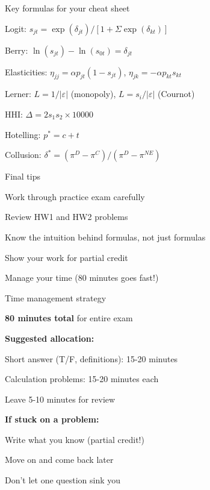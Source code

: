 \documentclass[notes,11pt, aspectratio=169]{beamer}
\newenvironment{wideitemize}{\itemize\addtolength{\itemsep}{10pt}}{\enditemize}
\newenvironment{wideenumerate}{\enumerate\addtolength{\itemsep}{10pt}}{\endenumerate}
\begin{document}
\begin{frame}{Key formulas for your cheat sheet}
	\begin{wideitemize}
		\item Logit: $s_{jt} = \exp(\delta_{jt})/[1 + \Sigma\exp(\delta_{kt})]$
		\item Berry: $\ln(s_{jt}) - \ln(s_{0t}) = \delta_{jt}$
		\item Elasticities: $\eta_{jj} = \alpha p_{jt}(1-s_{jt})$, $\eta_{jk} = -\alpha p_{kt} s_{kt}$
		\item Lerner: $L = 1/|\varepsilon|$ (monopoly), $L = s_i/|\varepsilon|$ (Cournot)
		\item HHI: $\Delta = 2 s_1 s_2 \times 10000$
		\item Hotelling: $p^* = c + t$
		\item Collusion: $\delta^* = (\pi^D - \pi^C)/(\pi^D - \pi^{NE})$
	\end{wideitemize}
\end{frame}

\begin{frame}{Final tips}
	\begin{wideenumerate}
		\item Work through practice exam carefully
		\item Review HW1 and HW2 problems
		\item Know the intuition behind formulas, not just formulas
		\item Show your work for partial credit
		\item Manage your time (80 minutes goes fast!)
	\end{wideenumerate}
\end{frame}

\begin{frame}{Time management strategy}
	\begin{wideitemize}
		\item \textbf{80 minutes total} for entire exam
		\item \textbf{Suggested allocation:}
		\begin{wideitemize}
			\vspace{3pt}
			\item Short answer (T/F, definitions): 15-20 minutes
			\item Calculation problems: 15-20 minutes each
			\item Leave 5-10 minutes for review
		\end{wideitemize}
		\item \textbf{If stuck on a problem:}
		\begin{wideitemize}
			\vspace{3pt}
			\item Write what you know (partial credit!)
			\item Move on and come back later
			\item Don't let one question sink you
		\end{wideitemize}
	\end{wideitemize}
\end{frame}
\end{document}
